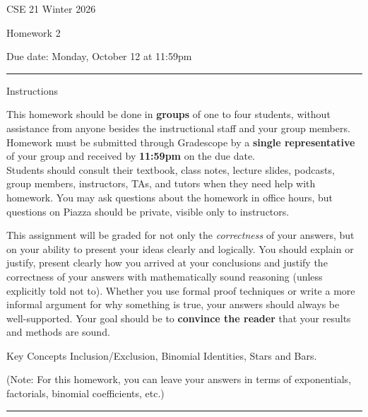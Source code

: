 \documentclass[10pt,letterpaper,unboxed,cm]{article}
\begin{document}
\hfill{CSE 21 Winter 2026}

\hfill{Homework 2}

\hfill{Due date: Monday, October 12 at 11:59pm}

\begin{center}
\begin{minipage}[t]{5.7in}
\rule{\linewidth}{2pt}
{\sc Instructions}\newline

This homework should be done in {\bf groups} of one to four students, without assistance from anyone besides the instructional staff and your group members.  Homework must be submitted through Gradescope by a {\bf single representative} of your group and received by {\bf 11:59pm} on the due date.\\
 

Students should consult their textbook, class notes, lecture slides, podcasts, group members, instructors, TAs, and tutors when 
they need help with homework. You may ask questions about the homework in office hours, but questions on Piazza should be private, visible only to instructors. 

This assignment will be graded for not only the \emph{correctness} of your answers, but on your ability to present your ideas clearly and logically. You should explain or justify, present clearly how you arrived at your conclusions and justify the correctness of your answers with mathematically sound reasoning (unless explicitly told not to). Whether you use formal proof techniques or write a more informal argument for why something is true, your answers should always be well-supported. Your goal should be to {\bf convince the reader} that your results and methods are sound.






{\sc Key Concepts} Inclusion/Exclusion, Binomial Identities, Stars and Bars.

(Note: For this homework, you can leave your answers in terms of exponentials, factorials, binomial coefficients, etc.)

\rule{\linewidth}{2pt}
\end{minipage} \hfill

\end{center}
\end{document}
